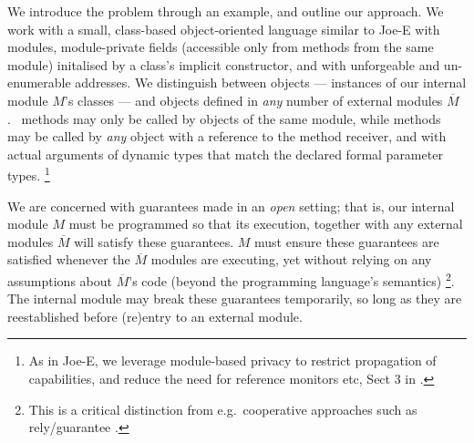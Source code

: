 \newcommand{\pwd}{key}

\renewcommand{\password}{key\xspace}

We introduce the problem  through an example, and outline our
approach.  We work with a  small, class-based object-oriented language similar to Joe-E \cite{JoeE} with modules,   module-private fields
({accessible} only from   methods {from} the same module)
initalised by a class's implicit constructor,
and with unforgeable and un-enumerable addresses.
%
We distinguish between  \emph{\internalO}
objects --- instances of our internal module $M$'s classes ---
and \emph{\externalO} objects defined in
\emph{any} number of external modules $\overline M$.~ 
{ methods  {may only be} called by objects of the same
  module,  while   methods  may be called by \emph{any}
  object with a reference to the method receiver, {and with
  actual arguments of  dynamic types that match} the declared formal parameter types.} 
\footnote{As in Joe-E, we leverage  module-based privacy to restrict propagation of capabilities, and reduce the need for reference monitors etc, \cf Sect 3 in  \cite{JoeE}.}   

 \label{s:concepts}

We are concerned with guarantees made in an \emph{open} setting; that
is, our internal module
$M$ must be programmed so that 
its execution, together with any external modules $\overline M$
will satisfy these guarantees.
$M$ must ensure these guarantees are satisfied
whenever the
$\overline M$  \emph{\externalM} modules are executing,
yet without relying on any assumptions about $\overline M$'s code
(beyond the programming language's semantics)%
\footnote{
This is a critical distinction from e.g.\
cooperative approaches such as rely/guarantee
\cite{relyGuarantee-HayesJones-setss2017,relyGuarantee-vanStaden-mpc2015}.}.
The internal module may break these guarantees temporarily,
so long as they {are reestablished} before (re)entry to an external module.
 

 
